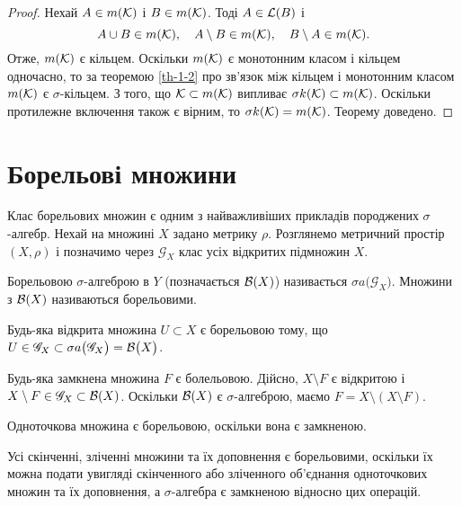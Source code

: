 \begin{proof}
	Нехай $A\in m(\mathcal K)$ і $B\in m(\mathcal K)$. Тоді $A\in\mathcal L(B)$ і
	$$
	A\cup B\in m(\mathcal K),\quad A\setminus B\in m(\mathcal K),\quad B\setminus A\in m(\mathcal K).
	$$
	Отже, $m(\mathcal K)$ є кільцем.
	Оскільки $m(\mathcal K)$ є монотонним класом і кільцем одночасно, то за теоремою \ref{th-1-2} про зв'язок між кільцем і монотонним класом $m(\mathcal K)$ є $\sigma$-кільцем. З того, що $\mathcal K\subset m(\mathcal K)$ випливає $\sigma k(\mathcal K)\subset m(\mathcal K)$. Оскільки протилежне включення також є вірним, то $\sigma k(\mathcal K)= m(\mathcal K)$. Теорему доведено.
\end{proof}

\section{Борельові множини}

Клас борельових множин є одним з найважливіших прикладів породжених $\sigma$-алгебр. Нехай на множині $X$ задано метрику $\rho$. Розглянемо метричний простір $(X,\rho)$ і позначимо через $\mathscr G_X$ клас усіх відкритих підмножин $X$.

\begin{definition}
	\label{def-1-8}
	Борельовою $\sigma$-алгеброю в $Y$ (позначається $\mathcal B(X)$) називається $\sigma a\big(\mathscr G_X\big)$. Множини з $\mathcal B(X)$ називаються борельовими.
\end{definition}

\begin{example}
	\label{ex-b-1}
	Будь-яка відкрита множина $U\subset X$ є борельовою тому, що $U\in\mathscr G_X\subset \sigma a\big(\mathscr G_X\big)=\mathcal B\big(X\big)$.
\end{example}

\begin{example}
	\label{ex-b-2}
	Будь-яка замкнена множина $F$ є болельовою.  Дійсно, $X\setminus F$ є відкритою і $X\setminus F\in\mathscr G_X\subset \mathcal B(X)$. Оскільки $\mathcal B(X)$ є $\sigma$-алгеброю, маємо $F=X\setminus(X\setminus F)$.
\end{example}

\begin{example}
	\label{ex-b-3}
	Одноточкова множина є борельовою, оскільки вона є замкненою. 
\end{example}

\begin{example}
	\label{ex-b-4}
	Усі скінченні, зліченні множини та їх доповнення є борельовими, оскільки їх можна подати увигляді скінченного або зліченного об'єднання одноточкових множин та їх доповнення, а $\sigma$-алгебра є замкненою відносно цих операцій. 
\end{example}

